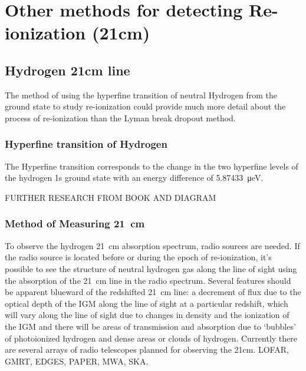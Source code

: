
\section{Other methods for detecting Re-ionization (21cm)} %
\label{sec:other_methods_for_detecting_re-ionization}

    \subsection{Hydrogen 21cm line} %
    \label{sub:Hydrogen_21cm}
        The method of using the hyperfine transition of neutral Hydrogen from the ground state to study re-ionization could provide much more detail about the process of re-ionization than the Lyman break dropout method.

         \subsubsection{Hyperfine transition of Hydrogen} %
         \label{subsub:Hyperfine_Hydrogen}
            The Hyperfine transition corresponds to the change in the two hyperfine levels of the hydrogen 1s ground state with an energy difference of \SI{5.87433}{\micro\electronvolt}.

            FURTHER RESEARCH FROM BOOK AND DIAGRAM

        \subsubsection{Method of Measuring \SI{21}{\centi\metre}} %
    	\label{subsub:Measuring_21cm}
            To observe the hydrogen \SI{21}{\centi\metre} absorption spectrum, radio sources are needed. If the radio source is located before or during the epoch of re-ionization, it's possible to see the structure of neutral hydrogen gas along the line of sight using the absorption of the \SI{21}{\centi\metre} line in the radio spectrum. Several features should be apparent blueward of the redshifted \SI{21}{\centi\metre} line: a decrement of flux due to the optical depth of the IGM along the line of sight at a particular redshift, which will vary along the line of sight due to changes in density and the ionization of the IGM and there will be areas of transmission and absorption due to `bubbles' of photoionized hydrogen and dense areas or clouds of hydrogen. Currently there are several arrays of radio telescopes planned for observing the 21cm. LOFAR, GMRT, EDGES, PAPER, MWA, SKA.

